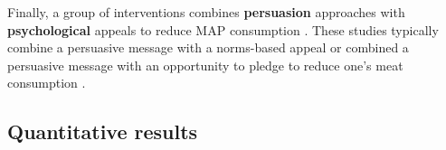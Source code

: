 \documentclass[sn-nature,referee,pdflatex]{sn-jnl}
\begin{document}
\begin{comment}
The first psychology study meeting our inclusion criteria was published in 2017.
\end{comment}

Finally, a group of interventions combines \textbf{persuasion}
approaches with \textbf{psychological} appeals to reduce MAP consumption
\citep{berndsen2005, bertolaso2015, carfora2023, fehrenbach2015, hennessy2016, mathur2021effectiveness, mattson2020, piester2020, shreedhar2021}.
These studies typically combine a persuasive message with a norms-based
appeal \citep{piester2020, mattson2020} or combined a persuasive message
with an opportunity to pledge to reduce one's meat consumption
\citep{mathur2021effectiveness, shreedhar2021}.

\subsection{Quantitative results}\label{quantitative-results}

\newpage

\renewcommand\refname{References}

\end{document}
